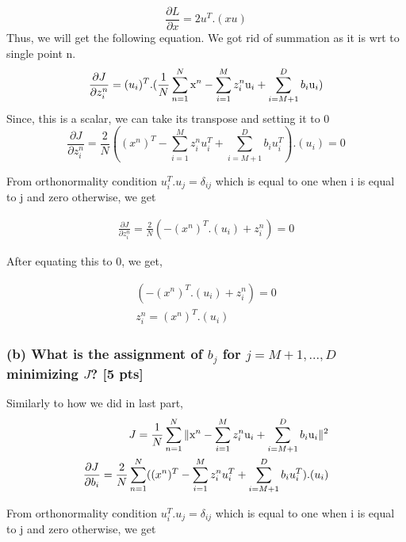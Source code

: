 \documentclass[twoside,10pt]{article}
\begin{document}
 $$
\frac{ \partial L }{ \partial x} = 2 u^T.(xu) 
$$
Thus, we will get the following equation. We got rid of summation as it is wrt to single point n. \\[.20cm]
$$\frac{\partial J}{\partial z^n_i} =(u_i)^T .(\frac{1}{N} \sum_{n=1}^N  \text x^n - \sum_{i=1}^M z_i^n \text u_i + \sum_{i=M+1}^D b_i \text u_i) 
$$
Since, this is a scalar, we can take its transpose and setting it to 0
$$\frac{\partial J}{\partial z^n_i} = \frac{2}{N} ((x^n)^T - \sum_{i=1}^M z_i^n u_i^T + \sum_{i=M+1}^D b_i u_i^T).(u_i) = 0
$$

From orthonormality condition $u_i^T.u_j = \delta_{ij}$  which is equal to one when i  is equal to j and zero otherwise, we get

\begin{equation} \nonumber
\begin{split}
\frac{\partial J}{\partial z^n_i} = \frac{2}{N} (-(x^n)^T.(u_i) + z_i^n) = 0
\end{split}
\end{equation}

After equating this to 0, we get,

\begin{equation} \nonumber
\begin{split}
(-(x^n)^T.(u_i) + z_i^n) = 0\\
z_i^n = (x^n)^T.(u_i)
\end{split}
\end{equation}

\subsubsection*{(b) What is the assignment of $b_j$ for $j=M+1, ..., D$ minimizing $J$? [5 pts]}
Similarly to how we did in last part, \\
\begin{equation} \nonumber
\begin{split}
J = \frac{1}{N} \sum_{n=1}^N \| \text x^n - \sum_{i=1}^M z_i^n \text u_i + \sum_{i=M+1}^D b_i \text u_i \|^2 \\
\frac{\partial J}{\partial b_i} = \frac{2}{N} \sum_{n=1}^N ((x^n)^T - \sum_{i=1}^M z_i^n u_i^T + \sum_{i=M+1}^D b_i u_i^T).(u_i)
\end{split}
\end{equation}


From orthonormality condition $u_i^T.u_j = \delta_{ij}$  which is equal to one when i  is equal to j and zero otherwise, we get
\end{document}
